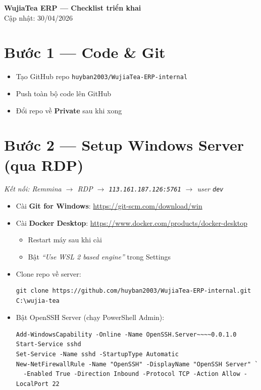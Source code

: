 \documentclass[12pt, a4paper]{article}
\begin{document}
\begin{center}
  {\LARGE\bfseries WujiaTea ERP — Checklist triển khai}\\[6pt]
  {\small\color{gray} Cập nhật: 30/04/2026}
\end{center}

\vspace{1em}

\section{Bước 1 — Code \& Git}

\begin{itemize}[label=\CheckedBox]
  \item Tạo GitHub repo \texttt{huyban2003/WujiaTea-ERP-internal}
  \item Push toàn bộ code lên GitHub
\end{itemize}
\begin{itemize}[label=\Square]
  \item Đổi repo về \textbf{Private} sau khi xong
\end{itemize}

\section{Bước 2 — Setup Windows Server (qua RDP)}

\textit{Kết nối: Remmina $\to$ RDP $\to$ \texttt{113.161.187.126:5761} $\to$ user \texttt{dev}}

\begin{itemize}[label=\Square]
  \item Cài \textbf{Git for Windows}: \url{https://git-scm.com/download/win}
  \item Cài \textbf{Docker Desktop}: \url{https://www.docker.com/products/docker-desktop}
    \begin{itemize}
      \item Restart máy sau khi cài
      \item Bật \textit{``Use WSL 2 based engine''} trong Settings
    \end{itemize}
  \item Clone repo về server:
\begin{lstlisting}
git clone https://github.com/huyban2003/WujiaTea-ERP-internal.git C:\wujia-tea
\end{lstlisting}
  \item Bật OpenSSH Server (chạy PowerShell Admin):
\begin{lstlisting}
Add-WindowsCapability -Online -Name OpenSSH.Server~~~~0.0.1.0
Start-Service sshd
Set-Service -Name sshd -StartupType Automatic
New-NetFirewallRule -Name "OpenSSH" -DisplayName "OpenSSH Server" `
  -Enabled True -Direction Inbound -Protocol TCP -Action Allow -LocalPort 22
\end{lstlisting}
\end{itemize}
\end{document}
